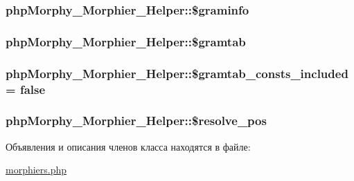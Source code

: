 \label{classphpMorphy__Morphier__Helper_af5c59000b5323b137555001c448da8f4}
\hypertarget{classphpMorphy__Morphier__Helper_a161eae1e122573b4c3ebaf136f0265e6}{
\subsubsection[{\$graminfo}]{\setlength{\rightskip}{0pt plus 5cm}phpMorphy\_\-Morphier\_\-Helper::\$graminfo}}
\label{classphpMorphy__Morphier__Helper_a161eae1e122573b4c3ebaf136f0265e6}
\hypertarget{classphpMorphy__Morphier__Helper_af04fce42bb731483c1f2d9ef825ff658}{
\subsubsection[{\$gramtab}]{\setlength{\rightskip}{0pt plus 5cm}phpMorphy\_\-Morphier\_\-Helper::\$gramtab}}
\label{classphpMorphy__Morphier__Helper_af04fce42bb731483c1f2d9ef825ff658}
\hypertarget{classphpMorphy__Morphier__Helper_a73079a526fb2c21cedd3f8067597e49c}{
\subsubsection[{\$gramtab\_\-consts\_\-included}]{\setlength{\rightskip}{0pt plus 5cm}phpMorphy\_\-Morphier\_\-Helper::\$gramtab\_\-consts\_\-included = false}}
\label{classphpMorphy__Morphier__Helper_a73079a526fb2c21cedd3f8067597e49c}
\hypertarget{classphpMorphy__Morphier__Helper_a03d35907d83e749956ee0eefe238b119}{
\subsubsection[{\$resolve\_\-pos}]{\setlength{\rightskip}{0pt plus 5cm}phpMorphy\_\-Morphier\_\-Helper::\$resolve\_\-pos}}
\label{classphpMorphy__Morphier__Helper_a03d35907d83e749956ee0eefe238b119}


Объявления и описания членов класса находятся в файле:\begin{DoxyCompactItemize}
\item 
\hyperlink{morphiers_8php}{morphiers.php}\end{DoxyCompactItemize}
